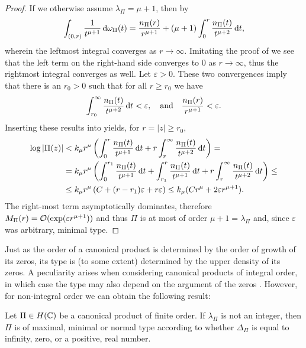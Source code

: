 \begin{proof}
    If we otherwise assume $\lambda_\Pi = \mu + 1$, then by 
    $$ \int_{(0, r)} \frac{1}{t^{\mu + 1}} \mathop{}\!\mathrm{d} \omega_\Pi(t) = \frac{n_\Pi(r)}{r^{\mu + 1}} + (\mu + 1) \int_0^r \frac{n_\Pi(t)}{t^{\mu + 2}} \mathop{}\!\mathrm{d} t, $$
    wherein the leftmost integral converges as $r \to \infty$. Imitating the proof of  we see that the left term on the right-hand side converges to $0$ as $r \to \infty$, thus the rightmost integral converges as well. Let $\varepsilon > 0$. These two convergences imply that there is an $r_0 > 0$ such that for all $r \geq r_0$ we have
    $$ \int_{r_0}^\infty \frac{n_\Pi(t)}{t^{\mu + 2}} \mathop{}\!\mathrm{d} t < \varepsilon, \quad \textrm{and} \quad \frac{n_\Pi(r)}{r^{\mu + 1}} < \varepsilon. $$
    Inserting these results into  yields, for $r = \vert z \vert \geq r_0$,
    \begin{align*}
        \log \vert \Pi(z) \vert &< k_\mu r^\mu \left( \int_0^r \frac{n_\Pi(t)}{t^{\mu + 1}} \mathop{}\!\mathrm{d} t + r \int_r^\infty \frac{n_\Pi(t)}{t^{\mu + 2}} \mathop{}\!\mathrm{d} t \right) = \\
        &= k_\mu r^\mu \left( \int_0^{r_1} \frac{n_\Pi(t)}{t^{\mu + 1}} \mathop{}\!\mathrm{d} t + \int_{r_1}^r \frac{n_\Pi(t)}{t^{\mu + 1}} \mathop{}\!\mathrm{d} t + r \int_r^\infty \frac{n_\Pi(t)}{t^{\mu + 2}} \mathop{}\!\mathrm{d} t \right) \leq \\
        &\leq k_\mu r^\mu \left(C + (r - r_1) \varepsilon + r \varepsilon \right) \leq k_\mu (C r^\mu + 2 \varepsilon r^{\mu + 1}).
    \end{align*}
    The right-most term asymptotically dominates, therefore $M_\Pi(r) = \mathcal{O}(\exp(\varepsilon r^{\mu + 1}))$ and thus $\Pi$ is at most of order $\mu + 1 = \lambda_\Pi$ and, since $\varepsilon$ was arbitrary, minimal type.
\end{proof}

Just as the order of a canonical product is determined by the order of growth of its zeros, its type is (to some extent) determined by the upper density of its zeros. A peculiarity arises when considering canonical products of integral order, in which case the type may also depend on the argument of the zeros \cite{levin-distribution-of-zeros}. However, for non-integral order we can obtain the following result:

\begin{theorem} \label{thm:canonical-product-type-density}
    Let $\Pi \in H(\mathbb{C})$ be a canonical product of finite order. If $\lambda_\Pi$ is not an integer, then $\Pi$ is of maximal, minimal or normal type according to whether $\Delta_\Pi$ is equal to infinity, zero, or a positive, real number.
\end{theorem}

